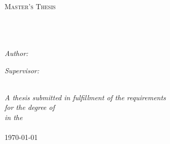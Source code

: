 \documentclass[
11pt, %
english, %
singlespacing, %
headsepline, %
]{MastersDoctoralThesis} %
\author{John \textsc{McCormack}} %
\begin{document}
\frontmatter %

\pagestyle{plain} %


\begin{titlepage}
\begin{center}

\textsc{\LARGE \univname}\\[1.5cm] %
\textsc{\Large Master's Thesis}\\[0.5cm] %

\HRule \\[0.4cm] %
{\huge \bfseries \ttitle}\\[0.4cm] %
\HRule \\[1.5cm] %
 
\begin{minipage}{0.4\textwidth}
\begin{flushleft} \large
\emph{Author:}\\
\href{http://www.jdmccormack.com}{\authorname} %
\end{flushleft}
\end{minipage}
\begin{minipage}{0.4\textwidth}
\begin{flushright} \large
\emph{Supervisor:} \\
\href{https://floridapolytechnic.org/staff/integlia/}{\supname} %
\end{flushright}
\end{minipage}\\[3cm]
 
\large \textit{A thesis submitted in fulfillment of the requirements\\ for the degree of \degreename}\\[0.3cm] %
\textit{in the}\\[0.4cm]
\deptname\\[2cm] %
 
{\large \today}\\[4cm] %
 
\vfill
\end{center}
\end{titlepage}
\end{document}
